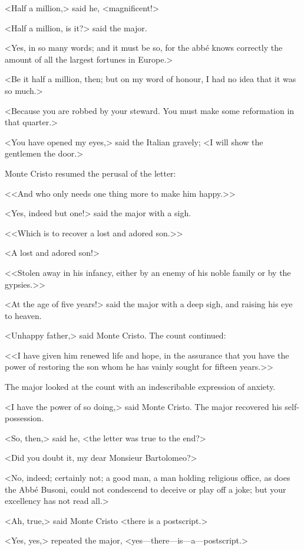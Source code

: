  <Half a million,> said he, <magnificent!> 

 <Half a million, is it?> said the major. 

 <Yes, in so many words; and it must be so, for the abbé knows correctly the amount of all the largest fortunes in Europe.> 

 <Be it half a million, then; but on my word of honour, I had no idea that it was so much.> 

 <Because you are robbed by your steward. You must make some reformation in that quarter.> 

 <You have opened my eyes,> said the Italian gravely; <I will show the gentlemen the door.> 

 Monte Cristo resumed the perusal of the letter: 

 <<And who only needs one thing more to make him happy.>> 

 <Yes, indeed but one!> said the major with a sigh. 

 <<Which is to recover a lost and adored son.>> 

 <A lost and adored son!> 

 <<Stolen away in his infancy, either by an enemy of his noble family or by the gypsies.>> 

 <At the age of five years!> said the major with a deep sigh, and raising his eye to heaven. 

 <Unhappy father,> said Monte Cristo. The count continued: 

 <<I have given him renewed life and hope, in the assurance that you have the power of restoring the son whom he has vainly sought for fifteen years.>> 

 The major looked at the count with an indescribable expression of anxiety. 

 <I have the power of so doing,> said Monte Cristo. The major recovered his self-possession. 

 <So, then,> said he, <the letter was true to the end?> 

 <Did you doubt it, my dear Monsieur Bartolomeo?> 

 <No, indeed; certainly not; a good man, a man holding religious office, as does the Abbé Busoni, could not condescend to deceive or play off a joke; but your excellency has not read all.> 

 <Ah, true,> said Monte Cristo <there is a postscript.> 

 <Yes, yes,> repeated the major, <yes—there—is—a—postscript.> 

